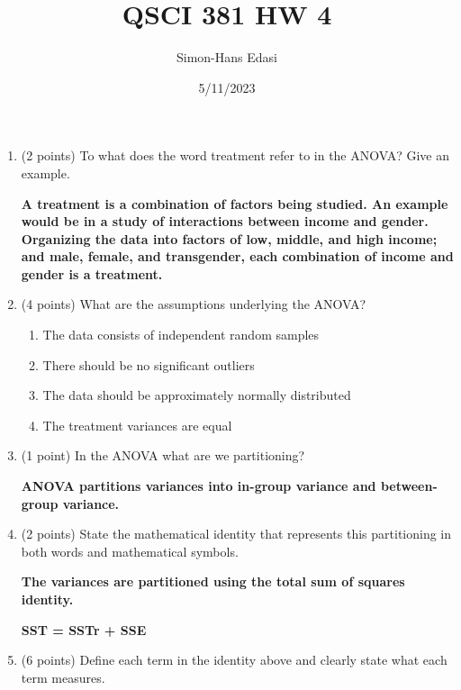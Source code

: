 \documentclass{article}
\title{QSCI 381 HW 4}
\date{5/11/2023}
\author{Simon-Hans Edasi}
\begin{document}
	\maketitle






\begin{enumerate}
	\item (2 points) To what does the word treatment refer to in the ANOVA? Give an example.
	
	\textbf{A treatment is a combination of factors being studied. An example would be in a study of interactions between income and gender. Organizing the data into factors of low, middle, and high income; and male, female, and transgender, each combination of income and gender is a treatment.}\\
	
	\item (4 points) What are the assumptions underlying the ANOVA?

	\begin{enumerate}\bfseries{}

		\item The data consists of independent random samples
		\item There should be no significant outliers
		\item The data should be approximately normally distributed
		\item The treatment variances are equal \\
		
	\end{enumerate}	 
		
	\item (1 point) In the ANOVA what are we partitioning?
	
	\textbf{ANOVA partitions variances into in-group variance and between-group variance.} \\
	
	\item (2 points) State the mathematical identity that represents this partitioning in both words and mathematical symbols.
	
	\textbf{The variances are partitioned using the total sum of squares identity.}
	
	\textbf{SST = SSTr + SSE} \\
	
	\item (6 points) Define each term in the identity above and clearly state what each term measures.
	

\end{enumerate}
\end{document}
